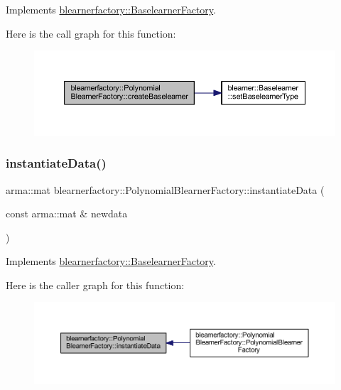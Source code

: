 Implements \hyperlink{classblearnerfactory_1_1_baselearner_factory_ac3584a20a84834099a15908690b837bb}{blearnerfactory\+::\+Baselearner\+Factory}.

Here is the call graph for this function\+:\nopagebreak
\begin{figure}[H]
\begin{center}
\leavevmode
\includegraphics[width=350pt]{classblearnerfactory_1_1_polynomial_blearner_factory_ac0c7f742da0a2de444e91a0cfb0a9384_cgraph}
\end{center}
\end{figure}
\mbox{\label{classblearnerfactory_1_1_polynomial_blearner_factory_aeea9c480671ae7cf7d3be470ce0feaef}} 
\subsubsection{\texorpdfstring{instantiate\+Data()}{instantiateData()}}
{\footnotesize\ttfamily arma\+::mat blearnerfactory\+::\+Polynomial\+Blearner\+Factory\+::instantiate\+Data (\begin{DoxyParamCaption}\item[{const arma\+::mat \&}]{newdata }\end{DoxyParamCaption})\hspace{0.3cm}{\ttfamily [virtual]}}



Implements \hyperlink{classblearnerfactory_1_1_baselearner_factory_ac4a38c4815fb33b8d4785745117c5e57}{blearnerfactory\+::\+Baselearner\+Factory}.

Here is the caller graph for this function\+:\nopagebreak
\begin{figure}[H]
\begin{center}
\leavevmode
\includegraphics[width=350pt]{classblearnerfactory_1_1_polynomial_blearner_factory_aeea9c480671ae7cf7d3be470ce0feaef_icgraph}
\end{center}
\end{figure}


